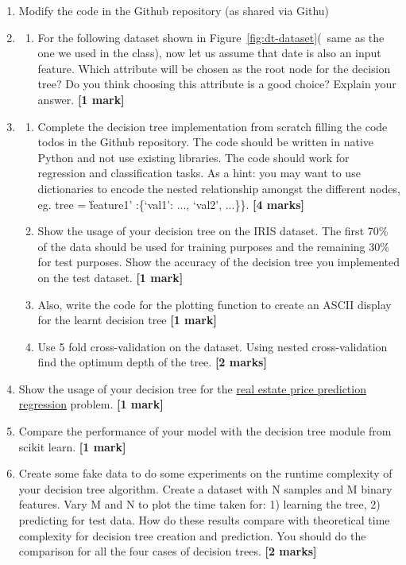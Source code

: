 \documentclass[colorlinks]{article}
\begin{document}
\begin{enumerate}
	\item Modify the code in the Github repository (as shared via Githu)
	\item 	\begin{enumerate}
		\item For the following dataset shown in Figure~\ref{fig:dt-dataset}(~same as the one we used in the class), now let us assume that date is also an input feature. Which attribute will be chosen as the root node for the decision tree? Do you think choosing this attribute is a good choice? Explain your answer.  \textbf{[1 mark]}
	\end{enumerate}



\item 	\begin{enumerate}
	

	
		\item Complete the decision tree implementation from scratch filling the code todos in the Github repository. The code should be written in native Python and not use existing libraries. The code should work for regression and classification tasks. As a hint: you may want to use dictionaries to encode the nested relationship amongst the different nodes, eg. tree = \`feature1' :\{`val1': ..., `val2', ...\}\}. \textbf{[4 marks]}
		\item Show the usage of your decision tree on the IRIS dataset. The first 70\% of the data should be used for training purposes and the remaining 30\% for test purposes. Show the accuracy of the decision tree you implemented on the test dataset. \textbf{[1 mark]}
		\item Also, write the code for the plotting function to create an ASCII display for the learnt decision tree \textbf{[1 mark]}
		\item Use 5 fold cross-validation on the dataset. Using nested cross-validation find the optimum depth of the tree. \textbf{[2 marks]}
	\end{enumerate} 
	
	\item Show the usage of your decision tree for the \href{https://archive.ics.uci.edu/ml/datasets/Real+estate+valuation+data+set}{real estate price prediction regression} problem. \textbf{[1 mark]}
	\item Compare the performance of your model with the decision tree module from scikit learn. \textbf{[1 mark]}
	\item Create some fake data to do some experiments on the runtime complexity of your decision tree algorithm. Create a dataset with N samples and M binary features. Vary M and N to plot the time taken for: 1) learning the tree, 2) predicting for test data. How do these results compare with theoretical time complexity for decision tree creation and prediction. You should do the comparison for all the four cases of decision trees. \textbf{[2 marks]}	
	

\end{enumerate}
\end{document}
